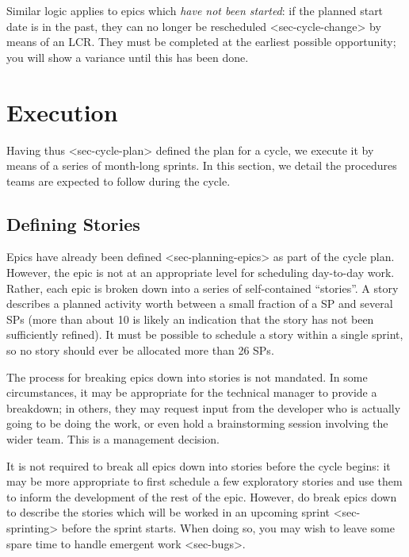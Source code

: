 Similar logic applies to epics which \emph{have not been started}: if
the planned start date is in the past, they can no longer be rescheduled
\textless{}sec-cycle-change\textgreater{} by means of an LCR. They must
be completed at the earliest possible opportunity; you will show a
variance until this has been done.

\section{Execution}\label{execution}

Having thus \textless{}sec-cycle-plan\textgreater{} defined the plan for
a cycle, we execute it by means of a series of month-long sprints. In
this section, we detail the procedures teams are expected to follow
during the cycle.

\subsection{Defining Stories}\label{defining-stories}

Epics have already been defined \textless{}sec-planning-epics\textgreater{}
as part of the cycle plan. However, the epic is not at an appropriate
level for scheduling day-to-day work. Rather, each epic is broken down
into a series of self-contained ``stories''. A story describes a planned
activity worth between a small fraction of a SP and several SPs (more
than about 10 is likely an indication that the story has not been
sufficiently refined). It must be possible to schedule a story within a
single sprint, so no story should ever be allocated more than 26 SPs.

The process for breaking epics down into stories is not mandated. In
some circumstances, it may be appropriate for the technical manager to
provide a breakdown; in others, they may request input from the
developer who is actually going to be doing the work, or even hold a
brainstorming session involving the wider team. This is a management
decision.

It is not required to break all epics down into stories before the cycle
begins: it may be more appropriate to first schedule a few exploratory
stories and use them to inform the development of the rest of the epic.
However, do break epics down to describe the stories which will be
worked in an
upcoming sprint \textless{}sec-sprinting\textgreater{} before the sprint
starts. When doing so, you may wish to leave some spare time to handle
emergent work \textless{}sec-bugs\textgreater{}.

